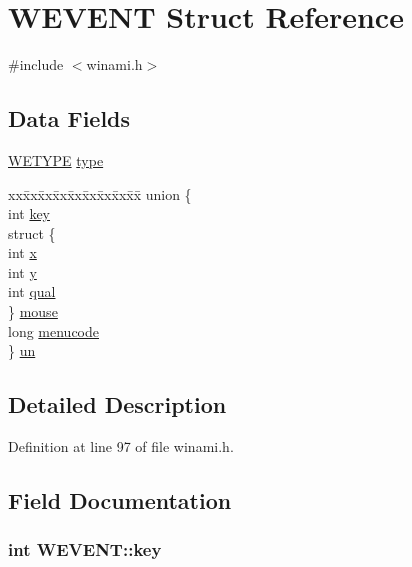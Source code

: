 \hypertarget{structWEVENT}{\section{W\+E\+V\+E\+N\+T Struct Reference}
\label{structWEVENT}
}


{\ttfamily \#include $<$winami.\+h$>$}

\subsection*{Data Fields}
\begin{DoxyCompactItemize}
\item 
\hyperlink{winami_8h_a947974ed96ae99c292b698854e310ebe}{W\+E\+T\+Y\+P\+E} \hyperlink{structWEVENT_a218bdffc41cff7b53f666a9a1f0fd714}{type}
\item 
\begin{tabbing}
xx\=xx\=xx\=xx\=xx\=xx\=xx\=xx\=xx\=\kill
union \{\\
\>int \hyperlink{structWEVENT_a33aabbd5a0f5cb005e24df8ccc93bf67}{key}\\
\>struct \{\\
\>\>int \hyperlink{structWEVENT_a29084caaf7aed001d9903b674186bcf2}{x}\\
\>\>int \hyperlink{structWEVENT_acdf2e5c197cee7c096f0dbf0d75d93e5}{y}\\
\>\>int \hyperlink{structWEVENT_a9dd2bf0011530edde4bf5b5129f99d2e}{qual}\\
\>\} \hyperlink{structWEVENT_a28753a26ccd665dcb9d2a253556911ef}{mouse}\\
\>long \hyperlink{structWEVENT_a37d8a22af42f56bedf26367521257f31}{menucode}\\
\} \hyperlink{structWEVENT_aa1fde3395f49a17259c056ec58ffc1e9}{un}\\

\end{tabbing}\end{DoxyCompactItemize}


\subsection{Detailed Description}


Definition at line 97 of file winami.\+h.



\subsection{Field Documentation}
\hypertarget{structWEVENT_a33aabbd5a0f5cb005e24df8ccc93bf67}{
\subsubsection[{key}]{\setlength{\rightskip}{0pt plus 5cm}int W\+E\+V\+E\+N\+T\+::key}}\label{structWEVENT_a33aabbd5a0f5cb005e24df8ccc93bf67}


